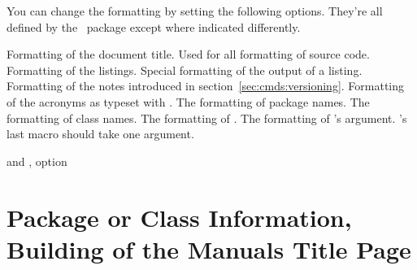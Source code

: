 \documentclass[load-preamble]{cnltx-doc}
\begin{document}
You can change the formatting by setting the following options.  They're all
defined by the \cnltxexample\ package except where indicated differently.

\begin{options}
    Formatting of the document title.
    Used for all formatting of source code.
    Formatting of the listings.
  \Default
    Special formatting of the output of a listing.
    \byclass Formatting of the notes introduced in
    section~\ref{sec:cmds:versioning}.
    Formatting of the acronyms as typeset with
    .
    The formatting of package names.
    The formatting of class names.
    The formatting of .
    The formatting of 's argument.
    's last macro should take one argument.
\end{options}

\begin{example}
   and , option 
\end{example}
  
\section{Package or Class Information,  Building of the Manuals Title Page}
\end{document}
